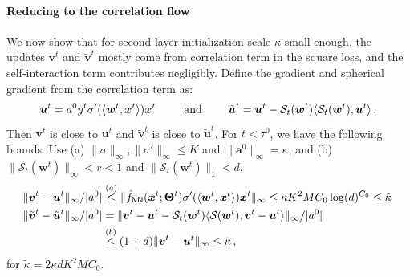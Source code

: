 \documentclass[11pt]{article}
\newcommand{\<}{\langle}
\renewcommand{\>}{\rangle}
\theoremstyle{definition}
\def\ba{{\boldsymbol a}}
\def\bu{{\boldsymbol u}}
\def\bv{{\boldsymbol v}}
\def\bw{{\boldsymbol w}}
\def\bx{{\boldsymbol x}}
\def\bTheta{{\boldsymbol \Theta}}
\def\hf{{\hat f}}
\def\cS{{\mathcal S}}
\def\NN{{\sf NN}}
\def\NN{{\sf NN}}
\def\bu{{\boldsymbol u}}
\def\bv{{\boldsymbol v}}
\def\bTheta{{\boldsymbol \Theta}}
\def\NN{{\sf NN}}
\def\bw{{\boldsymbol w}}
\def\bx{{\boldsymbol x}}
\def\ba{{\boldsymbol a}}
\def\bu{{\boldsymbol u}}
\def\cS{{\mathcal S}}
\def\bu{{\boldsymbol u}}
\def\bTheta{{\boldsymbol \Theta}}
\def\tbu{\Tilde \bu}
\def\hf{\hat f}
\newcommand{\fNN}{\hf_{\NN}}
\begin{document}
\paragraph*{Reducing to the correlation flow}
We now show that for second-layer initialization scale $\kappa$ small enough, the updates $\bv^t$ and $\tilde{\bv}^t$ mostly come from correlation term in the square loss, and the self-interaction term contributes negligibly. Define the gradient and spherical gradient from the correlation term as:
\begin{align*}
\bu^t = a^0 y^t \sigma'(\<\bw^t,\bx^t\>) \bx^t\, \qquad \mbox{ and } \qquad \tbu^t = \bu^t - \cS_t(\bw^t)\<\cS_t(\bw^t),\bu^t\>\,.
\end{align*}
Then $\bv^t$ is close to $\bu^t$ and $\tilde{\bv}^t$ is close to $\tilde{\bu}^t$.
For $t < \tau^0$, we have the following bounds. Use (a) $\|\sigma\|_{\infty}, \|\sigma'\|_{\infty} \leq K$ and $\|\ba^0\|_{\infty} = \kappa$, and (b) $\|\cS_t(\bw^t)\|_{\infty} < r < 1$ and  $\|\cS_t(\bw^t)\|_1 < d$,
\begin{equation}\label{eq:v-vs-u}
\begin{aligned}
\|\bv^t - \bu^t\|_{\infty} / |a^0| &\stackrel{(a)}{\leq} \|\fNN(\bx^t;\bTheta^t) \sigma'(\<\bw^t,\bx^t\>)\bx^t\|_{\infty} \leq \kappa K^2MC_0 \log(d)^{C_0} \leq \tilde{\kappa}\, \\
\|\tilde{\bv}^t - \tilde{\bu}^t\|_{\infty} / |a^0| &= \|\bv^t - \bu^t - \cS_t(\bw^t)\<\cS(\bw^t), \bv^t - \bu^t\>\|_{\infty} / |a^0| \\
&\stackrel{(b)}{\leq} (1+d)\|\bv^t - \bu^t\|_{\infty} \leq \tilde{\kappa}\,,
\end{aligned}
\end{equation}
for
$\tilde{\kappa} = 2\kappa dK^2MC_0$.
\end{document}
